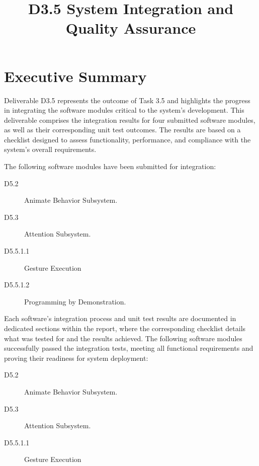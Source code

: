 \documentclass{CSSRforAfrica}
\begin{document}



\title{D3.5 System Integration and Quality Assurance}

\partner{}                          




\maketitle
 

\section*{Executive Summary}
\label{executive_summary}



\noindent Deliverable D3.5 represents the outcome of Task 3.5 and highlights the progress in integrating the software modules critical to the system's development. This deliverable comprises the integration results for four submitted software modules, as well as their corresponding unit test outcomes. The results are based on a checklist designed to assess functionality, performance, and compliance with the system's overall requirements.

\noindent The following software modules have been submitted for integration:
\begin{description}
    \item[D5.2] Animate Behavior Subsystem.
    \item[D5.3] Attention Subsystem.
    \item[D5.5.1.1] Gesture Execution
    \item[D5.5.1.2] Programming by Demonstration.
\end{description}

\noindent Each software's integration process and unit test results are documented in dedicated sections within the report, where the corresponding checklist details what was tested for and the results achieved.
The following software modules successfully passed the integration tests, meeting all functional requirements and proving their readiness for system deployment:
\begin{description}
    \item[D5.2] Animate Behavior Subsystem.
    \item[D5.3] Attention Subsystem.
    \item[D5.5.1.1] Gesture Execution
\end{description}
\end{document}

